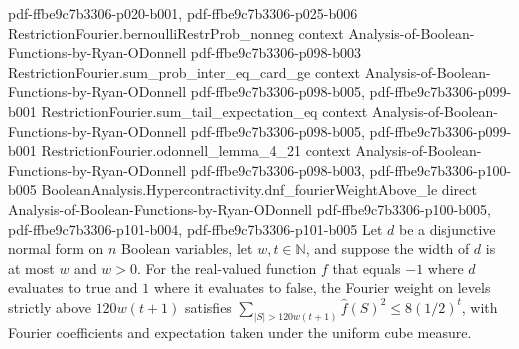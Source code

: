 \begin{lemma}
  {pdf-ffbe9c7b3306-p020-b001,
    pdf-ffbe9c7b3306-p025-b006}
\proofstep
  {RestrictionFourier.bernoulliRestrProb_nonneg}
  {context}
  {Analysis-of-Boolean-Functions-by-Ryan-ODonnell}
  {pdf-ffbe9c7b3306-p098-b003}
\proofstep
  {RestrictionFourier.sum_prob_inter_eq_card_ge}
  {context}
  {Analysis-of-Boolean-Functions-by-Ryan-ODonnell}
  {pdf-ffbe9c7b3306-p098-b005,
    pdf-ffbe9c7b3306-p099-b001}
\proofstep
  {RestrictionFourier.sum_tail_expectation_eq}
  {context}
  {Analysis-of-Boolean-Functions-by-Ryan-ODonnell}
  {pdf-ffbe9c7b3306-p098-b005,
    pdf-ffbe9c7b3306-p099-b001}
\proofstep
  {RestrictionFourier.odonnell_lemma_4_21}
  {context}
  {Analysis-of-Boolean-Functions-by-Ryan-ODonnell}
  {pdf-ffbe9c7b3306-p098-b003,
    pdf-ffbe9c7b3306-p100-b005}
\proofstep
  {BooleanAnalysis.Hypercontractivity.dnf_fourierWeightAbove_le}
  {direct}
  {Analysis-of-Boolean-Functions-by-Ryan-ODonnell}
  {pdf-ffbe9c7b3306-p100-b005,
    pdf-ffbe9c7b3306-p101-b004,
    pdf-ffbe9c7b3306-p101-b005}
Let $d$ be a disjunctive normal form on $n$ Boolean variables, let $w,t\in\mathbb N$,
and suppose the width of $d$ is at most $w$ and $w>0$. For the real-valued function $f$
that equals $-1$ where $d$ evaluates to true and $1$ where it evaluates to false, the
Fourier weight on levels strictly above $120w(t+1)$ satisfies
$\sum_{|S|>120w(t+1)}\widehat f(S)^2\le 8(1/2)^t$, with Fourier coefficients and
expectation taken under the uniform cube measure.
\end{lemma}

